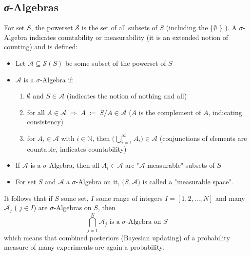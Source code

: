 \subsection*{\textit{σ}-Algebras}
For set $S$, the powerset $\mathcal{S}$ is the set of all subsets of $S$ (including the \{$ \emptyset $ \} ).
A $\sigma$-Algebra indicates countability or measurability (it is an extended notion of counting) and is defined:
\begin{itemize}
    \item Let $\mathcal{A} \subseteq \mathcal{S}(S)$ be some subset of the powerset of $S$
    \item $\mathcal{A}$ is a $\sigma$-Algebra if:
    \begin{enumerate}
        \item $\emptyset$ and $S \in  \mathcal{A}$  \;\;(indicates the notion of nothing and all)
        \item for all $A \in \mathcal{A}\; \Rightarrow{ } \; \overline{A}\; \coloneqq \;S/A \in \mathcal{A}$  \;\;($\overline{A}$ is the complement of $A$, indicating consistency) 
        \item for $A_i \in  \mathcal{A}$ with $i \in \mathbb{N}$, then $\Big( \bigcup\limits_{i=1}^{\infty} A_i\Big)\in \mathcal{A}$ \;\;(conjunctions of elements are countable, indicates countability)
    \end{enumerate}
    \item If $\mathcal{A}$ is a $\sigma$-Algebra, then all  $A_i \in  \mathcal{A}$ are "$\mathcal{A}$-measurable" subsets of $S$
    \item For set $S$ and $\mathcal{A}$ a $\sigma$-Algebra on it, $\big( S, \mathcal{A}\big)$ is called a "measurable space".
\end{itemize}
It follows that if $S$ some set,  $I$ some range of integers  $I=[1,2,...,N]$ and many $\mathcal{A}_j$ ( $j\in I$) are $\sigma$-Algebras on $S$, then 
\begin{equation*}
    \bigcap\limits_{j=1}^{N} \mathcal{A}_j \mbox{ is a } \sigma\mbox{-Algebra on }S
\end{equation*}
which means that combined posteriors (Bayesian updating) of a probability measure of many experiments are again a probability.\\

